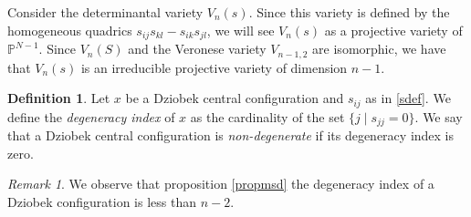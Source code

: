 \documentclass{amsart}
\theoremstyle{definition}
\newtheorem{definition}[theorem]{Definition}
\theoremstyle{remark}
\newtheorem{remark}[theorem]{Remark}
\numberwithin{equation}{section}
\begin{document}













Consider the determinantal variety $V_n(s)$. Since this variety is defined by the homogeneous quadrics $s_{ij}s_{kl}-s_{ik}s_{jl}$, we will see $V_n(s)$ as a projective variety of $\mathbb{P}^{N-1}$. Since $V_n(S)$ and the Veronese variety $V_{n-1,2}$ are isomorphic, we have that $V_n(s)$ is an irreducible projective variety of dimension $n-1$.


\begin{definition}
Let $x$ be a Dziobek central configuration and $s_{ij}$ as in \eqref{sdef}. We define the \emph{degeneracy index} of $x$ as the cardinality of the set $\{j \mid s_{jj}=0 \}$. We say that a Dziobek central configuration is \emph{non-degenerate} if its degeneracy index is zero.
\end{definition}


\begin{remark}
We observe that proposition \ref{propmsd} the degeneracy index of a Dziobek configuration is less than $n-2$.     
\end{remark}
\end{document}
